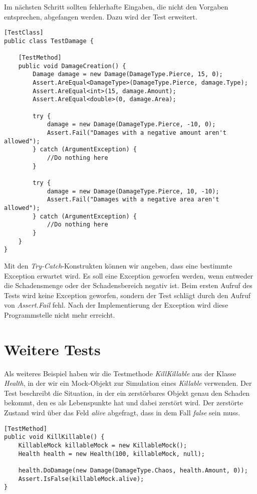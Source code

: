 Im nächsten Schritt sollten fehlerhafte Eingaben, die nicht den Vorgaben entsprechen, abgefangen werden. Dazu wird der Test erweitert.\\

\begin{lstlisting}[caption={[Erweiterter Test der Klasse Damage]Erweiterter Test der Klasse Damage}]
[TestClass]
public class TestDamage {

	[TestMethod]
	public void DamageCreation() {
		Damage damage = new Damage(DamageType.Pierce, 15, 0);
		Assert.AreEqual<DamageType>(DamageType.Pierce, damage.Type);
		Assert.AreEqual<int>(15, damage.Amount);
		Assert.AreEqual<double>(0, damage.Area);

		try {
			damage = new Damage(DamageType.Pierce, -10, 0);
            Assert.Fail("Damages with a negative amount aren't allowed");
        } catch (ArgumentException) {
            //Do nothing here
        }

        try {
            damage = new Damage(DamageType.Pierce, 10, -10);
            Assert.Fail("Damages with a negative area aren't allowed");
        } catch (ArgumentException) {
            //Do nothing here
        }
	}
}
\end{lstlisting}

Mit den \textit{Try-Catch}-Konstrukten können wir angeben, dass eine bestimmte Exception erwartet wird. Es soll eine Exception geworfen werden, wenn entweder die Schadensmenge oder der Schadensbereich negativ ist. Beim ersten Aufruf des Tests wird keine Exception geworfen, sondern der Test schlägt durch den Aufruf von \textit{Assert.Fail} fehl. Nach der Implementierung der Exception wird diese Programmstelle nicht mehr erreicht. 

\section{Weitere Tests}

Als weiteres Beispiel haben wir die Testmethode \textit{KillKillable} aus der Klasse \textit{Health}, in der wir ein Mock-Objekt zur Simulation eines \textit{Killable} verwenden. Der Test beschreibt die Situation, in der ein zerstörbares Objekt genau den Schaden bekommt, den es als Lebenspunkte hat und dabei zerstört wird. Der zerstörte Zustand wird über das Feld \textit{alive} abgefragt, dass in dem Fall \textit{false} sein muss.\\

\begin{lstlisting}[caption={[Beispiel KillKillable Testmethode]Beispiel der \textit{KillKillable}-Testmethode aus der Klasse \textit{TestHealth}}]
[TestMethod]
public void KillKillable() {
    KillableMock killableMock = new KillableMock();
    Health health = new Health(100, killableMock, null);

    health.DoDamage(new Damage(DamageType.Chaos, health.Amount, 0));
    Assert.IsFalse(killableMock.alive);
}
\end{lstlisting}

